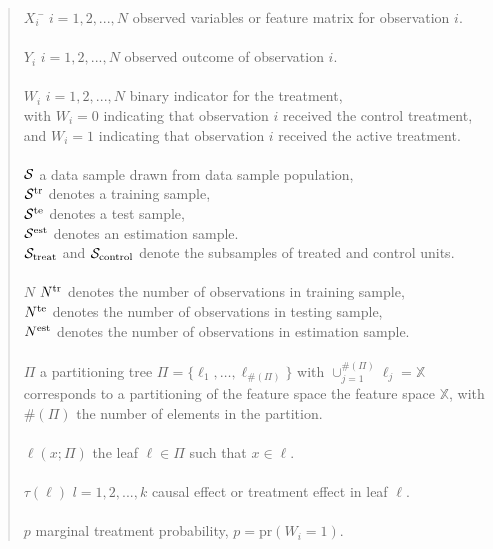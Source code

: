 \documentclass[11pt]{article}
\newcommand{\est}{{\rm est}}
\newcommand{\calp}{{\Pi}}
\newcommand{\cals}{{\cal S}}
\newcommand{\train}{{\rm tr}}
\newcommand{\test}{{\rm te}}
\begin{document}
\begin{quote}
\begin{tabbing}
$X_i$ \qquad\qquad \= $i = 1, 2,..., N$ \qquad observed variables or feature matrix for observation $i$.\\
\\
$Y_i$ \> $i = 1, 2, ..., N$ \qquad observed outcome of observation $i$.\\
\\
$W_i$ \>$i = 1, 2, ..., N$ \qquad binary indicator for the treatment,\\
\>with $W_i = 0$ indicating that observation $i$ received the control treatment, \\
\>and $W_i = 1$ indicating that observation $i$ received the active treatment.\\
\\
$\cals$ \> a data sample drawn from data sample population, \\
\> $\cals^{\text{tr}}$ denotes a training sample,\\
\> $\cals^{\text{te}}$ denotes a test sample, \\
\> $\cals^{\text{est}}$ denotes an estimation sample.\\
\> $\cals_{\text{treat}}$ and $\cals_{\text{control}}$ denote the subsamples of treated and control units.\\
\\
$N$ 
\> $N^\train$ denotes the number of observations in training sample,\\
\> $N^\test$ denotes the number of observations in testing sample,\\
\> $N^\est$ denotes the number of observations in estimation sample.\\
\\
$\Pi$ \>  a partitioning tree $\calp=\{\ell_1,\ldots,\ell_{\#(\Pi)}\}$ with $\cup_{j=1}^{\#(\calp)} \ell_j=\mathbb{X}$ \\ 
\> corresponds to a partitioning of the feature space the feature space $\mathbb{X}$, with\\
\> $\#(\calp)$ the number of elements in the partition.\\
\\
$\ell(x; \calp)$ \> the leaf $\ell \in \calp$ such that $x \in \ell$.\\
\\

$\tau(\ell)$ \> $l = 1, 2, ..., k$ \qquad causal effect or treatment effect in leaf $\ell$. \\
\\
$p$ \> marginal treatment probability, $p = \text{pr}(W_i = 1)$. 

\end{tabbing}
\end{quote}
\end{document}
